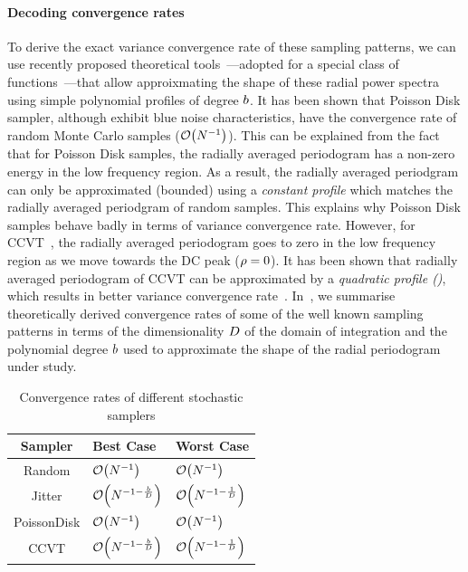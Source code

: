 \documentclass[11pt,fleqn]{book} %
\begin{document}
\paragraph{Decoding convergence rates}
To derive the exact variance convergence rate of these sampling patterns, we can use recently proposed theoretical tools~\cite{Pilleboue:2015:VAM}---adopted for a special class of functions~\cite{brandolini2001}---that allow approixmating the shape of these radial power spectra using simple polynomial profiles of degree $b$. It has been shown that Poisson Disk sampler, although exhibit blue noise characteristics, have the convergence rate of random Monte Carlo samples ($\mathcal{O}\!\left(N^{-1}\right)$). This can be explained from the fact that for Poisson Disk samples, the radially averaged periodogram has a non-zero energy in the low frequency region. As a result, the  radially averaged periodgram can only be approximated (bounded) using a \emph{constant profile} which matches the radially averaged periodgram of random samples. This explains why Poisson Disk samples  behave badly in terms of variance convergence rate. However, for CCVT~\cite{Balzer:2009:CPD:1531326.1531392}, the radially averaged periodogram goes to zero in the low frequency region as we move towards the DC peak ($\rho=0$). It has been shown that radially averaged periodogram of CCVT can be approximated by a \emph{quadratic profile ()}, which results in better variance convergence rate~\cite{Pilleboue:2015:VAM}. In~, we summarise theoretically derived convergence rates of some of the well known sampling patterns in terms of the dimensionality ${D}$ of the domain of integration and the polynomial degree $b$ used to approximate the shape of the radial periodogram under study. 

\begin{table}[ht]
  \centering
  \caption{Convergence rates of different stochastic samplers}
  \label{tab:convergencerates}
  \begin{tabular}{|c|l|l|}
    \hline
    Sampler & Best Case & Worst Case \\
    \hline
    Random & $\mathcal{O}\!\left(N^{-1}\right)$ & $\mathcal{O}\!\left(N^{-1}\right)$ \\
    Jitter &  $\mathcal{O}\!\left(N^{-1-\frac{b}{{D}}}\right)$ & $\mathcal{O}\!\left(N^{-1-\frac{1}{{D}}}\right)$\\ 
    PoissonDisk & $\mathcal{O}\!\left(N^{-1}\right)$ & $\mathcal{O}\!\left(N^{-1}\right)$\\
    CCVT & $\mathcal{O}\!\left(N^{-1-\frac{b}{{D}}}\right)$ & $\mathcal{O}\!\left(N^{-1-\frac{1}{{D}}}\right)$ \\ 
    \hline
  \end{tabular}
\end{table}
\end{document}
